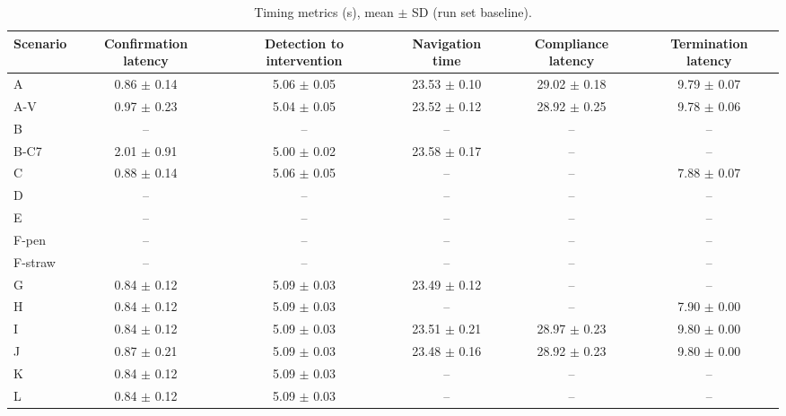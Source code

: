 \begin{table}[t]\centering\small
\caption{Timing metrics (s), mean $\pm$ SD (run set baseline).}
\begin{tabular}{lccccc}
\toprule
Scenario & Confirmation latency & Detection to intervention & Navigation time & Compliance latency & Termination latency \\
\midrule
A & 0.86 $\pm$ 0.14 & 5.06 $\pm$ 0.05 & 23.53 $\pm$ 0.10 & 29.02 $\pm$ 0.18 & 9.79 $\pm$ 0.07 \\
A-V & 0.97 $\pm$ 0.23 & 5.04 $\pm$ 0.05 & 23.52 $\pm$ 0.12 & 28.92 $\pm$ 0.25 & 9.78 $\pm$ 0.06 \\
B & -- & -- & -- & -- & -- \\
B-C7 & 2.01 $\pm$ 0.91 & 5.00 $\pm$ 0.02 & 23.58 $\pm$ 0.17 & -- & -- \\
C & 0.88 $\pm$ 0.14 & 5.06 $\pm$ 0.05 & -- & -- & 7.88 $\pm$ 0.07 \\
D & -- & -- & -- & -- & -- \\
E & -- & -- & -- & -- & -- \\
F-pen & -- & -- & -- & -- & -- \\
F-straw & -- & -- & -- & -- & -- \\
G & 0.84 $\pm$ 0.12 & 5.09 $\pm$ 0.03 & 23.49 $\pm$ 0.12 & -- & -- \\
H & 0.84 $\pm$ 0.12 & 5.09 $\pm$ 0.03 & -- & -- & 7.90 $\pm$ 0.00 \\
I & 0.84 $\pm$ 0.12 & 5.09 $\pm$ 0.03 & 23.51 $\pm$ 0.21 & 28.97 $\pm$ 0.23 & 9.80 $\pm$ 0.00 \\
J & 0.87 $\pm$ 0.21 & 5.09 $\pm$ 0.03 & 23.48 $\pm$ 0.16 & 28.92 $\pm$ 0.23 & 9.80 $\pm$ 0.00 \\
K & 0.84 $\pm$ 0.12 & 5.09 $\pm$ 0.03 & -- & -- & -- \\
L & 0.84 $\pm$ 0.12 & 5.09 $\pm$ 0.03 & -- & -- & -- \\
\bottomrule
\end{tabular}
\end{table}
